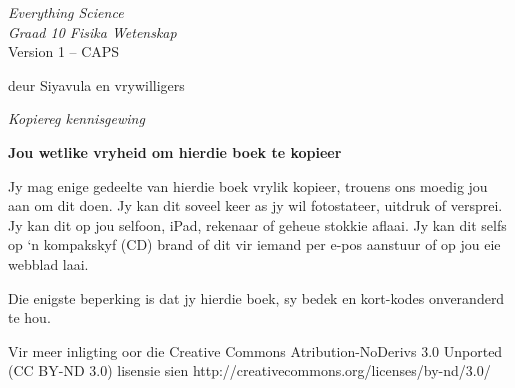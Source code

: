 
\begin{titlepage}
\begin{center}
    \thispagestyle{empty}

    \vspace*{4in}

    
    {\normalfont\sffamily\fontsize{36}\normalfont\itshape{Everything Science} \\ \vspace*{1cm}
     \normalfont\sffamily\fontsize{22}\normalfont\itshape{Graad 10 Fisika Wetenskap}}
    \vspace*{1in} \\
    \LARGE Version 1 -- CAPS \\

   {\vspace*{2in}
     deur Siyavula en vrywilligers
  

\vfill

    }
\end{center}
\end{titlepage}






\newpage
\thispagestyle{empty}
\begin{center}
\normalfont\sffamily\fontsize{22}\normalfont\itshape Kopiereg kennisgewing\\

\vspace*{1in}

\textbf{Jou wetlike vryheid om hierdie boek te kopieer}\\

\end{center}


{\Large
Jy mag enige gedeelte van hierdie boek vrylik kopieer, trouens ons moedig jou aan om dit doen. Jy kan dit soveel keer as jy wil fotostateer, uitdruk of versprei. Jy kan dit op jou selfoon, iPad, rekenaar of geheue stokkie aflaai. Jy kan dit selfs op ‘n kompakskyf (CD) brand of dit vir iemand per e-pos aanstuur of op jou eie webblad laai. \par

Die enigste beperking is dat jy hierdie boek, sy bedek en kort-kodes onveranderd te hou.\par

Vir meer inligting oor die Creative Commons Atribution-NoDerivs 3.0 Unported (CC BY-ND
3.0) lisensie sien http://creativecommons.org/licenses/by-nd/3.0/}\\

